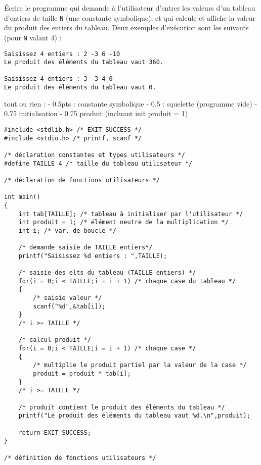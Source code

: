 Écrire le programme qui demande à l'utilisateur d'entrer les valeurs d'un tableau d'entiers de taille \verb|N| (une constante symbolique), et qui calcule et affiche la valeur du produit des
 entiers du tableau. Deux exemples d'exécution sont les suivants (pour \verb|N| valant 4) :
\begin{small}
\begin{verbatim}
Saisissez 4 entiers : 2 -3 6 -10
Le produit des éléments du tableau vaut 360.

Saisissez 4 entiers : 3 -3 4 0
Le produit des éléments du tableau vaut 0.
\end{verbatim}
\end{small}
tout ou rien :
- 0.5pts : constante symbolique
- 0.5 : squelette (programme vide)
- 0.75 initialisation
- 0.75 produit (incluant init produit = 1)
\begin{correction}
\begin{small}
\begin{verbatim}
#include <stdlib.h> /* EXIT_SUCCESS */
#include <stdio.h> /* printf, scanf */

/* déclaration constantes et types utilisateurs */
#define TAILLE 4 /* taille du tableau utilisateur */

/* déclaration de fonctions utilisateurs */

int main()
{
    int tab[TAILLE]; /* tableau à initialiser par l'utilisateur */
    int produit = 1; /* élément neutre de la multiplication */
    int i; /* var. de boucle */

    /* demande saisie de TAILLE entiers*/
    printf("Saisissez %d entiers : ",TAILLE);

    /* saisie des elts du tableau (TAILLE entiers) */
    for(i = 0;i < TAILLE;i = i + 1) /* chaque case du tableau */
    {
        /* saisie valeur */
        scanf("%d",&tab[i]);
    }
    /* i >= TAILLE */

    /* calcul produit */
    for(i = 0;i < TAILLE;i = i + 1) /* chaque case */
    {
        /* multiplie le produit partiel par la valeur de la case */
        produit = produit * tab[i];
    }
    /* i >= TAILLE */

    /* produit contient le produit des éléments du tableau */
    printf("Le produit des éléments du tableau vaut %d.\n",produit);

    return EXIT_SUCCESS;
}

/* définition de fonctions utilisateurs */

\end{verbatim}
\end{small}
\end{correction}


